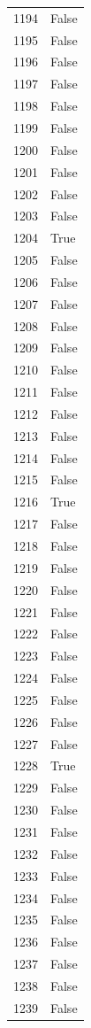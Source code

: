 \documentclass[
  letterpaper,
  DIV=11,
  numbers=noendperiod]{scrreprt}
\begin{document}
\begin{tabular}{ll}
1194 &  False \\
1195 &  False \\
1196 &  False \\
1197 &  False \\
1198 &  False \\
1199 &  False \\
1200 &  False \\
1201 &  False \\
1202 &  False \\
1203 &  False \\
1204 &   True \\
1205 &  False \\
1206 &  False \\
1207 &  False \\
1208 &  False \\
1209 &  False \\
1210 &  False \\
1211 &  False \\
1212 &  False \\
1213 &  False \\
1214 &  False \\
1215 &  False \\
1216 &   True \\
1217 &  False \\
1218 &  False \\
1219 &  False \\
1220 &  False \\
1221 &  False \\
1222 &  False \\
1223 &  False \\
1224 &  False \\
1225 &  False \\
1226 &  False \\
1227 &  False \\
1228 &   True \\
1229 &  False \\
1230 &  False \\
1231 &  False \\
1232 &  False \\
1233 &  False \\
1234 &  False \\
1235 &  False \\
1236 &  False \\
1237 &  False \\
1238 &  False \\
1239 &  False \\

\end{tabular}
\end{document}
